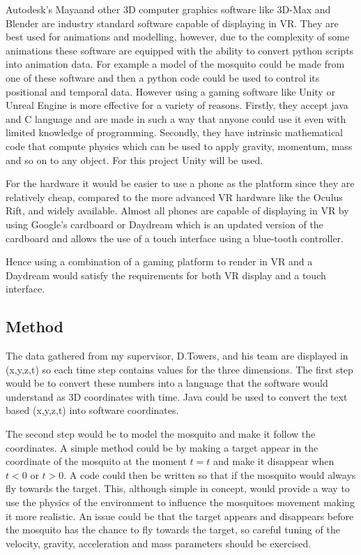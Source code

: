 Autodesk's Maya\textregistered and other 3D computer graphics software like 3D-Max and Blender are industry standard software capable of displaying in VR. They are best used for animations and modelling, however, due to the complexity of some animations these software are equipped with the ability to convert python scripts into animation data. For example a model of the mosquito could be made from one of these software and then a python code could be used to control its positional and temporal data. However using a gaming software like Unity\textregistered{} or Unreal Engine\textregistered{} is more effective for a variety of reasons. Firstly, they accept java and C language and are made in such a way that anyone could use it even with limited knowledge of programming. Secondly, they have intrinsic mathematical code that compute physics which can be used to apply gravity, momentum, mass and so on to any object. For this project Unity\textregistered{} will be used.

For the hardware it would be easier to use a phone as the platform since they are relatively cheap, compared to the more advanced VR hardware like the Oculus Rift, and widely available. Almost all phones are capable of displaying in VR by using Google's cardboard or Daydream\textregistered{} which is an updated version of the cardboard and allows the use of a touch interface using a blue-tooth controller. 

Hence using a combination of a gaming platform to render in VR and a Daydream\textregistered{} would satisfy the requirements for both VR display and a touch interface.

\subsection{Method}

The data gathered from my supervisor, D.Towers, and his team are displayed in (x,y,z,t) so each time step contains values for the three dimensions. The first step would be to convert these numbers into a language that the software would understand as 3D coordinates with time. Java could be used to convert the text based (x,y,z,t) into software coordinates. 

The second step would be to model the mosquito and make it follow the coordinates. A simple method could be by making a target appear in the coordinate of the mosquito at the moment $t=t$ and make it disappear when $t<0$ or $t>0$. A code could then be written so that if the mosquito would always fly towards the target. This, although simple in concept, would provide a way to use the physics of the environment to influence the mosquitoes movement making it more realistic. An issue could be that the target appears and disappears before the mosquito has the chance to fly towards the target, so careful tuning of the velocity, gravity, acceleration and mass parameters should be exercised.

